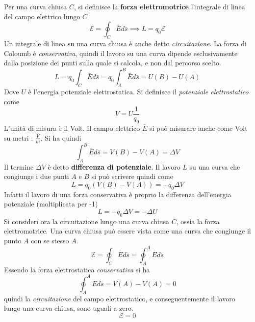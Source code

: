 \documentclass[10pt, letterpaper]{report}
\begin{document}
Per una curva chiusa $C$, si definisce la \textbf{forza elettromotrice} l'integrale di linea del campo elettrico lungo $C$
$$ \mathscr{E}=\oint_C \bar E d\bar s\implies L = q_0\mathscr{E}$$
Un integrale di linea su una curva chiusa è anche detto \textit{circuitazione}.\acc 
La forza di Coloumb è \textit{conservativa}, quindi il lavoro su una curva dipende esclusivamente dalla posizione dei punti sulla quale si calcola, e non dal percorso scelto. 
$$ L=q_0\int_C \bar E d\bar s= q_0\int_A^B \bar E d\bar s=U(B)-U(A)$$
Dove $U$ è l'energia potenziale elettrostatica. Si definisce il \textit{potenziale elettrostatico} come 
$$ V=U\frac{1}{q_0}$$
L'unità di misura è il Volt. Il campo elettrico $\bar E$ si può misurare anche come Volt su metri : $\frac{V}{m}$. Si ha quindi 
$$\int_A^B \bar E d\bar s=V(B)-V(A)=\Delta V$$
Il termine $\Delta V$ è detto \textbf{differenza di potenziale}. Il lavoro $L$ su una curva che congiunge i due punti $A$ e $B$ si può scrivere quindi come 
$$ L=q_0(V(B)-V(A))=-q_0\Delta V$$
Infatti  il lavoro di una forza conservativa è proprio la differenza dell'energia potenziale (moltiplicata per -1)
$$ L=-q_0\Delta V=-\Delta U$$
Si consideri ora la circuitazione lungo una curva chiusa $C$, ossia la forza elettromotrice. Una curva chiusa può essere vista come una curva che congiunge il punto $A$ con se stesso $A$. 
$$ \mathscr{E}=\oint_C \bar E d\bar s = \oint_A^A \bar E d\bar s$$
Essendo la forza elettrostatica \textit{conservativa} si ha 
$$\oint_A^A \bar E d\bar s = V(A)-V(A)=0 $$
quindi la \textit{circuitazione} del campo elettrostatico, e conseguentemente il lavoro lungo una curva chiusa, sono uguali a zero. 
$$\mathscr{E}=0 $$
\end{document}
